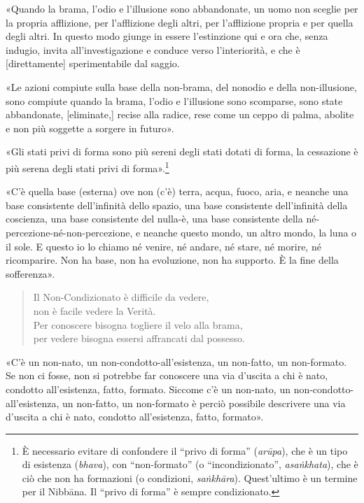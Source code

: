 

«Quando la brama, l’odio e l’illusione sono abbandonate, un uomo non sceglie per
la propria afflizione, per l’afflizione degli altri, per l’afflizione propria e
per quella degli altri. In questo modo giunge in essere l’estinzione qui e ora
che, senza indugio, invita all’investigazione e conduce verso l’interiorità, e
che è [direttamente] sperimentabile dal saggio.


«Le azioni compiute sulla base della non-brama, del nonodio e della
non-illusione, sono compiute quando la brama, l’odio e l’illusione sono
scomparse, sono state abbandonate, [eliminate,] recise alla radice, rese come un
ceppo di palma, abolite e non più soggette a sorgere in futuro».


«Gli stati privi di forma sono più sereni degli stati dotati di forma, la
cessazione è più serena degli stati privi di forma».\footnote{È necessario
  evitare di confondere il “privo di forma” (\emph{arūpa}), che è un tipo di
  esistenza (\emph{bhava}), con “non-formato” (o “incondizionato”,
  \emph{asaṅkhata}), che è ciò che non ha formazioni (o condizioni,
  \emph{saṅkhāra}). Quest’ultimo è un termine per il Nibbāna. Il “privo di
  forma” è sempre condizionato.}


«C’è quella base (esterna) ove non (c’è) terra, acqua, fuoco, aria, e neanche
una base consistente dell’infinità dello spazio, una base consistente
dell’infinità della coscienza, una base consistente del nulla-è, una base
consistente della né-percezione-né-non-percezione, e neanche questo mondo, un
altro mondo, la luna o il sole. E questo io lo chiamo né venire, né andare, né
stare, né morire, né ricomparire. Non ha base, non ha evoluzione, non ha
supporto. È la fine della sofferenza».

\begin{quote}
Il Non-Condizionato è difficile da vedere, \\
non è facile vedere la Verità. \\
Per conoscere bisogna togliere il velo alla brama, \\
per vedere bisogna essersi affrancati dal possesso.
\end{quote}

«C’è un non-nato, un non-condotto-all’esistenza, un non-fatto, un non-formato.
Se non ci fosse, non si potrebbe far conoscere una via d’uscita a chi è nato,
condotto all’esistenza, fatto, formato. Siccome c’è un non-nato, un
non-condotto-all’esistenza, un non-fatto, un non-formato è perciò possibile
descrivere una via d’uscita a chi è nato, condotto all’esistenza, fatto,
formato».

